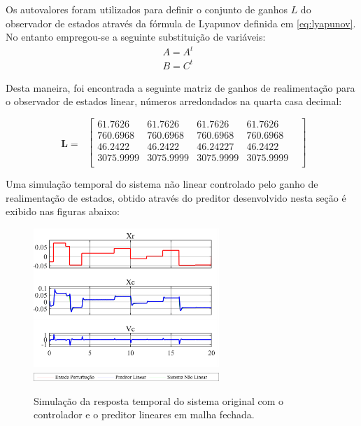 \documentclass[a4paper]{ifacconf}
\begin{document}
    Os autovalores foram utilizados para definir o conjunto de ganhos $L$ do observador de estados através da fórmula de Lyapunov definida em \ref{eq:lyapunov}. No entanto empregou-se a seguinte substituição de variáveis:
    \begin{equation} \label{eq:var_pred}
        \begin{split}
        A = A^{t}&\\
        B = C^{t}&
        \end{split}
    \end{equation}

    Desta maneira, foi encontrada a seguinte matriz de ganhos de realimentação para o observador de estados linear, números arredondados na quarta casa decimal:

    \begin{equation} \label{eq:ganhos_pred}
        \begin{split}
            \mathbf{L}=\
        \end{split}
        \begin{bmatrix}
          61.7626&   61.7626&   61.7626&   61.7626&\\
         760.6968&  760.6968&  760.6968&  760.6968&\\
          46.2422&   46.2422&   46.24227&  46.2422&\\
        3075.9999& 3075.9999& 3075.9999& 3075.9999&\\
        \end{bmatrix}
    \end{equation}

    Uma simulação temporal do sistema não linear controlado pelo ganho de realimentação de estados, obtido através do preditor desenvolvido nesta seção é exibido nas figuras abaixo:

    \FloatBarrier
    \begin{figure}[htbp]
        \begin{centering}
            \includegraphics[width=7cm]{img/simulaca_temporal_preditor_linear.png}
            \includegraphics[width=7cm]{img/simulaca_temporal_preditor_linear_erro_leg.png}
            \caption{Simulação da resposta temporal do sistema original com o controlador e o preditor lineares em malha fechada.}
            \label{fig:simulaca_temporal_preditor_linear}
        \end{centering}
    \end{figure}
    \FloatBarrier
\end{document}
